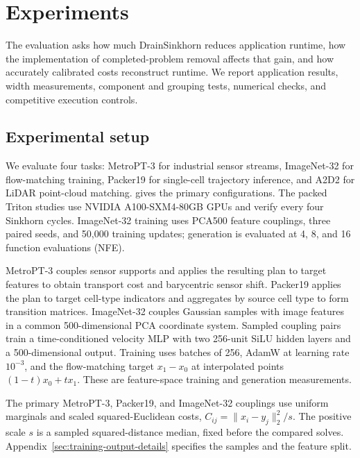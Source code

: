 \section{Experiments}
\label{sec:experiments}

The evaluation asks how much DrainSinkhorn reduces application runtime, how the implementation of completed-problem removal affects that gain, and how accurately calibrated costs reconstruct runtime. We report application results, width measurements, component and grouping tests, numerical checks, and competitive execution controls.

\subsection{Experimental setup}

We evaluate four tasks: MetroPT-3 for industrial sensor streams, ImageNet-32 for flow-matching training, Packer19 for single-cell trajectory inference, and A2D2 for LiDAR point-cloud matching.  gives the primary configurations. The packed Triton studies use NVIDIA A100-SXM4-80GB GPUs and verify every four Sinkhorn cycles. ImageNet-32 training uses PCA500 feature couplings, three paired seeds, and 50,000 training updates; generation is evaluated at 4, 8, and 16 function evaluations (NFE).

MetroPT-3 couples sensor supports and applies the resulting plan to target features to obtain transport cost and barycentric sensor shift. Packer19 applies the plan to target cell-type indicators and aggregates by source cell type to form transition matrices. ImageNet-32 couples Gaussian samples with image features in a common 500-dimensional PCA coordinate system. Sampled coupling pairs train a time-conditioned velocity MLP with two 256-unit SiLU hidden layers and a 500-dimensional output. Training uses batches of 256, AdamW at learning rate $10^{-3}$, and the flow-matching target $x_1-x_0$ at interpolated points $(1-t)x_0+tx_1$. These are feature-space training and generation measurements.

The primary MetroPT-3, Packer19, and ImageNet-32 couplings use uniform marginals and scaled squared-Euclidean costs, $C_{ij}=\lVert x_i-y_j\rVert_2^2/s$. The positive scale $s$ is a sampled squared-distance median, fixed before the compared solves. Appendix~\ref{sec:training-output-details} specifies the samples and the feature split.



